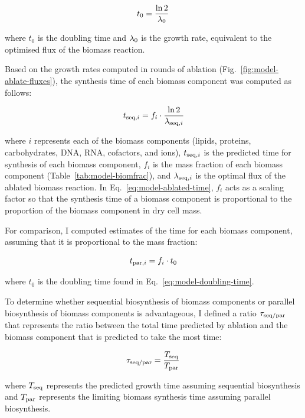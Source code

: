 \begin{equation}
  t_{0} = \frac{\ln 2}{\lambda_{0}}
  \label{eq:model-doubling-time}
\end{equation}

where $t_{0}$ is the doubling time and $\lambda_{0}$ is the growth rate, equivalent to the optimised flux of the biomass reaction.

Based on the growth rates computed in rounds of ablation (Fig.\ \ref{fig:model-ablate-fluxes}), the synthesis time of each biomass component was computed as follows:

\begin{equation}
  t_{\mathrm{seq},i} = f_{i} \cdot \frac{\ln 2}{\lambda_{\mathrm{seq},i}}
  \label{eq:model-ablated-time}
\end{equation}

where
$i$ represents each of the biomass components (lipids, proteins, carbohydrates, DNA, RNA, cofactors, and ions),
$t_{\mathrm{seq},i}$ is the predicted time for synthesis of each biomass component,
$f_{i}$ is the mass fraction of each biomass component (Table~\ref{tab:model-biomfrac}), and
$\lambda_{\mathrm{seq},i}$ is the optimal flux of the ablated biomass reaction.
In Eq.\ \ref{eq:model-ablated-time}, $f_{i}$ acts as a scaling factor so that the synthesis time of a biomass component is proportional to the proportion of the biomass component in dry cell mass.

For comparison, I computed estimates of the time for each biomass component, assuming that it is proportional to the mass fraction:

\begin{equation}
  t_{\mathrm{par},i} = f_{i} \cdot t_{0}
  \label{eq:model-proportional-time}
\end{equation}

where $t_{0}$ is the doubling time found in Eq.\ \ref{eq:model-doubling-time}.

To determine whether sequential biosynthesis of biomass components or parallel biosynthesis of biomass components is advantageous, I defined a ratio $\tau_{\mathrm{seq}/\mathrm{par}}$ that represents the ratio between the total time predicted by ablation and the biomass component that is predicted to take the most time:

\begin{equation}
  \tau_{\mathrm{seq}/\mathrm{par}} = \frac{T_{\mathrm{seq}}}{T_{\mathrm{par}}}
  \label{eq:model-ratio-simplified}
\end{equation}

where $T_{\mathrm{seq}}$ represents the predicted growth time assuming sequential biosynthesis and $T_{\mathrm{par}}$ represents the limiting biomass synthesis time assuming parallel biosynthesis.

